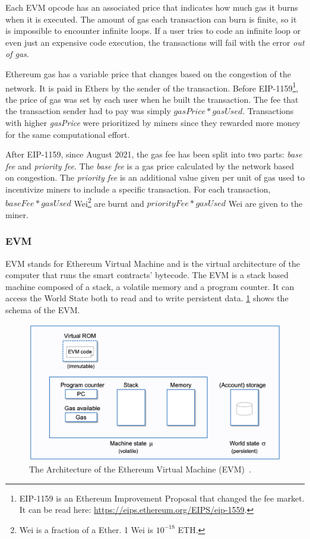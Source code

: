 Each EVM opcode has an associated price that indicates how much gas it burns when it is executed. The amount of gas each transaction can burn is finite, so it is impossible to encounter infinite loops. If a user tries to code an infinite loop or even just an expensive code execution, the transactions will fail with the error \textit{out of gas}.

Ethereum gas has a variable price that changes based on the congestion of the network. It is paid in Ethers by the sender of the transaction. Before EIP-1159\footnote{EIP-1159 is an Ethereum Improvement Proposal that changed the fee market. It can be read here: \url{https://eips.ethereum.org/EIPS/eip-1559}.}, the price of gas was set by each user when he built the transaction. The fee that the transaction sender had to pay was simply $gasPrice * gasUsed$. Transactions with higher \textit{gasPrice} were prioritized by miners since they rewarded more money for the same computational effort.

After EIP-1159, since August 2021, the gas fee has been split into two parts: \textit{base fee} and \textit{priority fee}. The \textit{base fee} is a gas price calculated by the network based on congestion. The \textit{priority fee} is an additional value given per unit of gas used to incentivize miners to include a specific transaction. For each transaction, $baseFee*gasUsed$ Wei\footnote{Wei is a fraction of a Ether. 1 Wei is $10^{-18}$ ETH.} are burnt and $priorityFee*gasUsed$ Wei are given to the miner.

\subsubsection{EVM}

EVM stands for Ethereum Virtual Machine and is the virtual architecture of the computer that runs the smart contracts' bytecode. The EVM is a stack based machine composed of a stack, a volatile memory and a program counter. It can access the World State both to read and to write persistent data. \cref{fig:evm-architecture} shows the schema of the EVM.

\begin{figure}[H]
    \centering
    \includegraphics[width=1\textwidth]{Figures/background/evm.png}
    \caption{The Architecture of the Ethereum Virtual Machine (EVM)~\cite{evm-illustrated}.}
    \label{fig:evm-architecture}
\end{figure}

